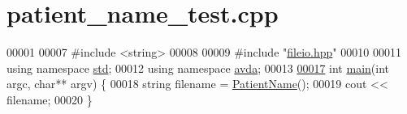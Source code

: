 \hypertarget{patient__name__test_8cpp_source}{\section{patient\+\_\+name\+\_\+test.\+cpp}
\label{patient__name__test_8cpp_source}
}

\begin{DoxyCode}
00001 
00007 \textcolor{preprocessor}{#include <string>}
00008 
00009 \textcolor{preprocessor}{#include "\hyperlink{fileio_8hpp}{fileio.hpp}"}
00010 
00011 \textcolor{keyword}{using namespace }\hyperlink{namespacestd}{std};
00012 \textcolor{keyword}{using namespace }\hyperlink{namespaceavda}{avda};
00013 
\hypertarget{patient__name__test_8cpp_source_l00017}{}\hyperlink{patient__name__test_8cpp_a3c04138a5bfe5d72780bb7e82a18e627}{00017} \textcolor{keywordtype}{int} \hyperlink{patient__name__test_8cpp_a3c04138a5bfe5d72780bb7e82a18e627}{main}(\textcolor{keywordtype}{int} argc, \textcolor{keywordtype}{char}** argv) \{
00018     \textcolor{keywordtype}{string} filename = \hyperlink{namespaceavda_ae20728e7e8ae50bf2f74849e538841ea}{PatientName}();
00019     cout << filename;
00020 \}
\end{DoxyCode}
